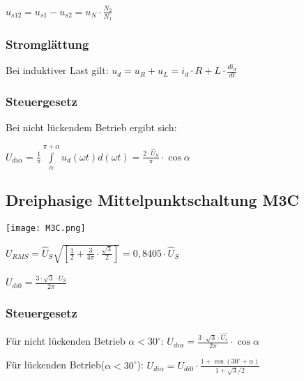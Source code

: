 \documentclass[german]{latex4ei/latex4ei_sheet}
\begin{document}
\begin{sectionbox}
\begin{symbolbox}
			$u_{s12} = u_{s1}-u_{s2} = u_N \cdot \frac{N_2}{N_1}$
			\subsubsection{Stromglättung}
				Bei induktiver Last gilt: $u_d = u_R + u_L = i_d\cdot R+L\cdot \frac{di_d}{dt}$
			\subsubsection{Steuergesetz}
				Bei nicht lückendem Betrieb ergibt sich:

				$U_{di\alpha} = \frac{1}{\pi}\int\limits_\alpha^{\pi+\alpha}u_d(\omega t)d(\omega  t) = \frac{2\cdot \hat{U}_S}{\pi}\cdot \cos \alpha$
		\end{symbolbox}
		\begin{symbolbox}
		\subsection{Dreiphasige Mittelpunktschaltung M3C}
			\texttt{[image: M3C.png]}

			$U_{RMS} = \hat{U}_S \sqrt{\left[ \frac{1}{2}+\frac{3}{4\pi}\cdot \frac{\sqrt{3}}{2}\right]} = 0,8405\cdot \hat{U}_S$
			
			$U_{di0} = \frac{3\cdot \sqrt{3}\cdot \hat{U}_S}{2\pi}$

			\subsubsection{Steuergesetz}
			Für nicht lückenden Betrieb $\alpha < 30^\circ$: $U_{di\alpha} = \frac{3\cdot \sqrt{3}\cdot \hat{U_s}}{2\pi}\cdot \cos \alpha$

			Für lückenden Betrieb($\alpha < 30^\circ$): $U_{di\alpha} = U_{di0}\cdot \frac{1+\cos(30^\circ + \alpha)}{1+\sqrt{3}/2}$
		\end{symbolbox}
	\end{sectionbox}
\end{document}
